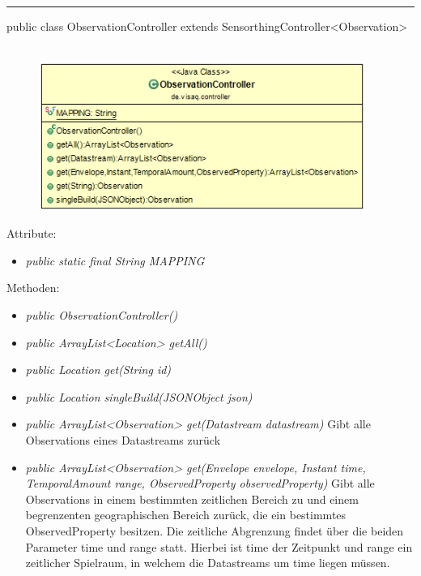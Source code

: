 \rule{\textwidth}{0.4pt}
public class ObservationController extends SensorthingController<Observation>
\\\\
\begin{minipage}{0.4\textwidth}
    \begin{figure}[H]
        {\centering\includegraphics[width=0.95\textwidth]{media/backend/controller/classes/ObservationController.png}}
    \end{figure}
    \end{minipage} \hfill
\begin{minipage}{0.6\textwidth}
\end{minipage}

Attribute:
\begin{itemize}
    \item \emph{public static final String MAPPING} \mappingDescription
\end{itemize}
Methoden:
\begin{itemize}
    \item \emph{public ObservationController()}
    \item \emph{public ArrayList<Location> getAll()}
    \extendsSensorthingController
    \item \emph{public Location get(String id)}
    \extendsSensorthingController
    \item \emph{public Location singleBuild(JSONObject json)}
    \extendsSensorthingController
    \item \emph{public ArrayList<Observation> get(Datastream datastream)}
    Gibt alle Observations eines Datastreams zurück
    \item \emph{public ArrayList<Observation> get(Envelope envelope, Instant time, TemporalAmount range, ObservedProperty observedProperty)}
    Gibt alle Observations in einem bestimmten zeitlichen Bereich zu und einem begrenzenten geographischen Bereich zurück, die ein bestimmtes ObservedProperty besitzen.
    Die zeitliche Abgrenzung findet über die beiden Parameter time und range statt. Hierbei ist time der Zeitpunkt und range ein zeitlicher Spielraum, in welchem die Datastreams um time liegen müssen.
\end{itemize}

